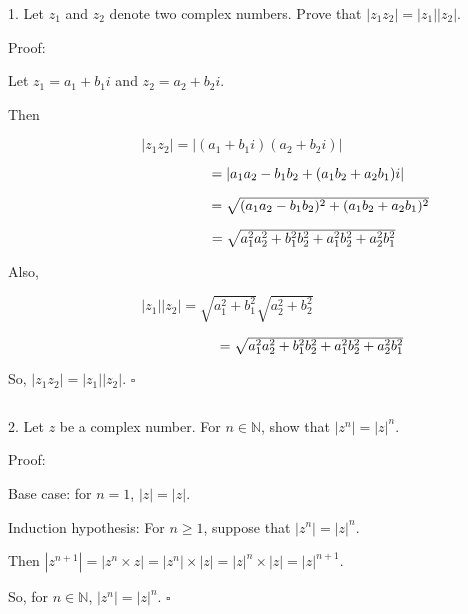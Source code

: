 \documentclass[12pt]{article}
\begin{document}
1. Let $z_1$ and $z_2$ denote two complex numbers. Prove that $|z_1z_2| = |z_1||z_2|$.

Proof:

Let $z_1 = a_1 + b_1i$ and $z_2 = a_2 + b_2i$. 

Then

$\hspace{4cm}|z_1z_2| = |(a_1 + b_1i)(a_2+b_2i)|$

$\hspace{5.1cm}= |a_1a_2 - b_1b_2 + (a_1b_2+a_2b_1)i|$

$\hspace{5.1cm}= \sqrt{(a_1a_2-b_1b_2)^2 + (a_1b_2+a_2b_1)^2}$

$\hspace{5.1cm}= \sqrt{a_1^2a_2^2 + b_1^2b_2^2 + a_1^2b_2^2+a_2^2b_1^2}$

Also,

$\hspace{4cm}|z_1||z_2| = \sqrt{a_1^2+b_1^2} \sqrt{a_2^2+b_2^2}$

$\hspace{5.3cm}= \sqrt{a_1^2a_2^2 + b_1^2b_2^2 + a_1^2b_2^2+a_2^2b_1^2}$

So, $|z_1z_2| = |z_1||z_2|$. $\square$

$$$$

2. Let $z$ be a complex number. For $n \in \mathbb{N}$, show that $|z^n| = |z|^n$.

Proof:

Base case: for $n=1$, $|z| = |z|$.

Induction hypothesis: For $n \geq 1$, suppose that $|z^n| = |z|^n$.

Then $|z^{n+1}| = |z^n \times z| = |z^n|\times|z| = |z|^n\times|z| = |z|^{n+1}$.

So, for $n \in \mathbb{N}$, $|z^n| = |z|^n$. $\square$
\end{document}
